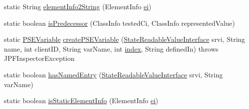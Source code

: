 \begin{DoxyCompactItemize}
\item 
static String \hyperlink{classgov_1_1nasa_1_1jpf_1_1inspector_1_1server_1_1programstate_1_1_state_value_aea337730b417cd995d983e1cbcff744e}{element\+Info2\+String} (Element\+Info \hyperlink{classgov_1_1nasa_1_1jpf_1_1inspector_1_1server_1_1programstate_1_1_state_value_array_element_a6173229e69d8b4dfecb57a30187a72bc}{ei})
\item 
static boolean \hyperlink{classgov_1_1nasa_1_1jpf_1_1inspector_1_1server_1_1programstate_1_1_state_value_aa23de04378976833758e7303f3d4cee6}{is\+Predecessor} (Class\+Info tested\+Ci, Class\+Info represented\+Value)
\item 
static \hyperlink{classgov_1_1nasa_1_1jpf_1_1inspector_1_1common_1_1pse_1_1_p_s_e_variable}{P\+S\+E\+Variable} \hyperlink{classgov_1_1nasa_1_1jpf_1_1inspector_1_1server_1_1programstate_1_1_state_value_a899ba1974881fe409b9b58d0ba90f3b5}{create\+P\+S\+E\+Variable} (\hyperlink{interfacegov_1_1nasa_1_1jpf_1_1inspector_1_1server_1_1programstate_1_1_state_readable_value_interface}{State\+Readable\+Value\+Interface} srvi, String name, int client\+ID, String var\+Name, int \hyperlink{classgov_1_1nasa_1_1jpf_1_1inspector_1_1server_1_1programstate_1_1_state_value_array_element_aa6411af2bddb25d2f9e779b08063e9e5}{index}, String defined\+In)  throws J\+P\+F\+Inspector\+Exception 
\item 
static boolean \hyperlink{classgov_1_1nasa_1_1jpf_1_1inspector_1_1server_1_1programstate_1_1_state_value_acf7b963024cd7f1cd5c23975621f83c7}{has\+Named\+Entry} (\hyperlink{interfacegov_1_1nasa_1_1jpf_1_1inspector_1_1server_1_1programstate_1_1_state_readable_value_interface}{State\+Readable\+Value\+Interface} srvi, String var\+Name)
\item 
static boolean \hyperlink{classgov_1_1nasa_1_1jpf_1_1inspector_1_1server_1_1programstate_1_1_state_value_a25dfd1e417420303104033dd3342c659}{is\+Static\+Element\+Info} (Element\+Info \hyperlink{classgov_1_1nasa_1_1jpf_1_1inspector_1_1server_1_1programstate_1_1_state_value_array_element_a6173229e69d8b4dfecb57a30187a72bc}{ei})
\end{DoxyCompactItemize}
